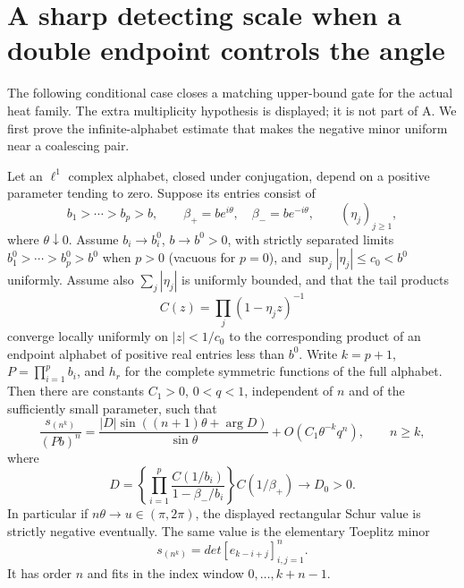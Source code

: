 \section{A sharp detecting scale when a double endpoint controls the angle}
\label{sec:analytic-dominant-double}

The following conditional case closes a matching upper-bound gate for
the actual heat family. The extra multiplicity hypothesis is displayed;
it is not part of A. We first prove the infinite-alphabet estimate that
makes the negative minor uniform near a coalescing pair.

\begin{lemma}
\label{lem:analytic-rectangular-pair}
Let an $\ell^1$ complex alphabet, closed under conjugation, depend on
a positive parameter tending to zero. Suppose its entries consist of
\[
 b_1>\cdots>b_p>b,\qquad
 \beta_+=be^{i\theta},\quad\beta_-=be^{-i\theta},\qquad
                         (\eta_j)_{j\ge1},
\]
where $\theta\downarrow0$. Assume $b_i\to b_i^0$,
$b\to b^0>0$, with strictly separated limits
$b_1^0>\cdots>b_p^0>b^0$ when $p>0$ (vacuous for $p=0$), and
$\sup_j|\eta_j|\le c_0<b^0$ uniformly. Assume also
$\sum_j|\eta_j|$ is uniformly bounded, and that the tail products
\[
             C(z)=\prod_j(1-\eta_jz)^{-1}
\]
converge locally uniformly on $|z|<1/c_0$ to the corresponding product of an endpoint
alphabet of positive real entries less than $b^0$. Write $k=p+1$,
$P=\prod_{i=1}^p b_i$, and $h_r$ for the complete symmetric functions
of the full alphabet. Then there are constants $C_1>0$, $0<q<1$,
independent of $n$ and of the sufficiently small parameter, such that
\begin{equation}\label{eq:analytic-rectangular-asymptotic}
 \frac{s_{(n^k)}}{(Pb)^n}
  =\frac{|D|\sin((n+1)\theta+\arg D)}{\sin\theta}
                         +O(C_1\theta^{-k}q^n),\qquad n\ge k,
\end{equation}
where
\[
 D=\left\{\prod_{i=1}^p
              \frac{C(1/b_i)}{1-\beta_-/b_i}\right\}C(1/\beta_+)
                             \longrightarrow D_0>0.
\]
In particular if $n\theta\to u\in(\pi,2\pi)$, the displayed
rectangular Schur value is strictly negative eventually.
The same value is the elementary Toeplitz minor
\begin{equation}\label{eq:analytic-rectangular-elementary-minor}
                  s_{(n^k)}=det[e_{k-i+j}]_{i,j=1}^n.
\end{equation}
It has order $n$ and fits in the index window $0,\ldots,k+n-1$.
\end{lemma}

